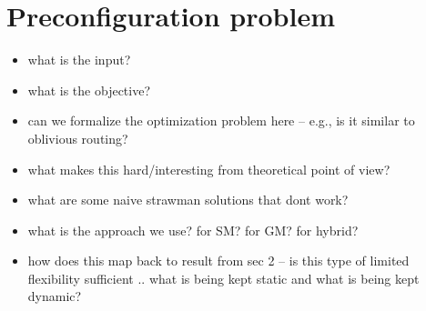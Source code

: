 \section{Preconfiguration problem}

\begin{itemize}

\item  what is the input?

\item  what is the objective?

\item can we formalize the optimization problem here -- e.g., is it similar
 to oblivious routing?

\item what makes this hard/interesting from theoretical point of view?

\item what are some naive strawman solutions that dont work? 

\item what is the approach we use? for SM? for GM? for hybrid?

\item how does this map back to result from sec 2 -- is this type of limited
flexibility sufficient .. what is being kept static and what is being kept
dynamic?

\end{itemize}
